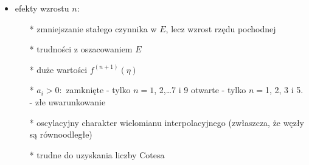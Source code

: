 	\begin{frame}
	\begin{itemize}
		\item efekty wzrostu $n$:
        \begin{itemize}
        	\item[*]  zmniejszanie stałego czynnika w $E$, lecz wzrost rzędu pochodnej
            \item[*] trudności z oszacowaniem $E$
            \item[*] duże wartości $f^{(n+1)}(\eta)$
            \item[*] $a_{i}>0:$
            zamknięte - tylko $n=1$, 2,\ldots 7 i 9
            otwarte - tylko $n=$1, 2, 3 i 5. - złe uwarunkowanie
            \item[*] oscylacyjny charakter wielomianu interpolacyjnego (zwłaszcza, że
 			węzły są równoodległe)
            \item[*] trudne do uzyskania liczby Cotesa
        \end{itemize}
	\end{itemize}
	\end{frame}






